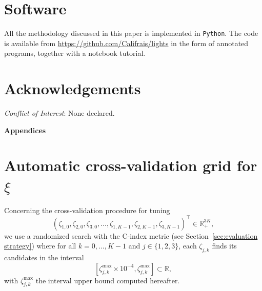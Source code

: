 \documentclass[11pt]{article}
\newcommand{\R}{\mathds R}
\begin{document}
\section*{Software}
All the methodology discussed in this paper is implemented in \texttt{Python}. The code is available from \url{https://github.com/Califrais/lights} in the form of annotated programs, together with a notebook tutorial.

\section*{Acknowledgements}
\textit{Conflict of Interest}: None declared.

\appendix

\begin{center}
\LARGE \textbf{Appendices}
\end{center}

\section{Automatic cross-validation grid for $\xi$}
\label{sec:auto-grid-cv}

Concerning the cross-validation procedure for tuning 
\[(\zeta_{1,0}, \zeta_{2,0}, \zeta_{3,0}, \ldots, \zeta_{1,K-1}, \zeta_{2,K-1}, \zeta_{3,K-1})^\top \in \R_+^{3K}, \]
we use a randomized search with the C-index metric (see Section~\ref{sec:evaluation strategy}) where for all $k=0, \ldots, K-1$ and $j \in \{1, 2, 3\}$, each $\zeta_{j,k}$ finds its candidates in the interval 
\[[\zeta_{j,k}^{\text{max}} \times 10^{-4}, \zeta_{j,k}^{\text{max}} ] \subset \R, \]
with $\zeta_{j,k}^{\text{max}}$ the interval upper bound computed hereafter.
\end{document}
